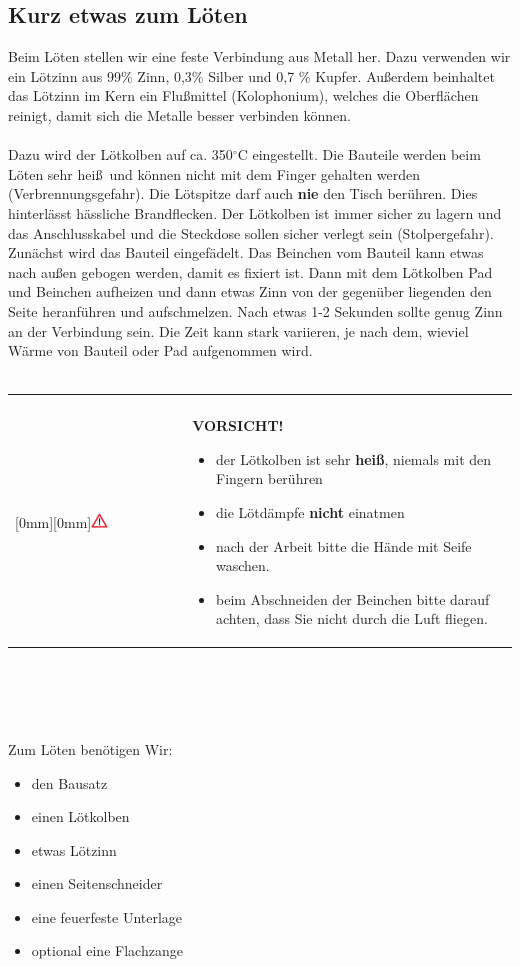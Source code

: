 \documentclass[a4paper]{article}
\newcommand\Vorsicht[1]{%
\ \\
\begin{tabular}{p{0.16\textwidth} p{0.79\textwidth}|}
\cline{2-2}
& \\
 \multirow{5}{*}{\raisebox{0mm}[0mm][0mm]{\includegraphics[width=0.1\textwidth]{../pictures/Vorsicht.png}}} & \textbf{VORSICHT!}{\begin{flushleft}#1\end{flushleft}} \\
\cline{2-2}
\end{tabular}
\ \\
}
\begin{document}
\subsection{Kurz etwas zum Löten}
Beim Löten stellen wir eine feste Verbindung aus Metall her. Dazu verwenden wir ein Lötzinn aus 99\% Zinn, 0,3\% Silber und 0,7 \% Kupfer. Außerdem beinhaltet das Lötzinn im Kern ein Flußmittel (Kolophonium), welches die Oberflächen reinigt, damit sich die Metalle besser verbinden können.\\
\ \\
Dazu wird der Lötkolben auf ca. 350$^{\circ}$C eingestellt. Die Bauteile werden beim Löten sehr hei\ss \ und können nicht mit dem Finger gehalten werden (Verbrennungsgefahr). Die Lötspitze darf auch \textbf{nie} den Tisch berühren. Dies hinterlässt hässliche Brandflecken. Der Lötkolben ist immer sicher zu lagern und das Anschlusskabel und die Steckdose sollen sicher verlegt sein (Stolpergefahr).\\
Zunächst wird das Bauteil eingefädelt. Das Beinchen vom Bauteil kann etwas nach au\ss en gebogen werden, damit es fixiert ist. Dann mit dem Lötkolben Pad und Beinchen aufheizen und dann etwas Zinn von der gegenüber liegenden den Seite heranführen und aufschmelzen. Nach etwas 1-2 Sekunden sollte genug Zinn an der Verbindung sein. Die Zeit kann stark variieren, je nach dem, wieviel Wärme von Bauteil oder Pad aufgenommen wird.\\
\Vorsicht{\begin{itemize} \item der Lötkolben ist sehr \textbf{heiß}, niemals mit den Fingern berühren
\item die Lötdämpfe \textbf{nicht} einatmen \item nach der Arbeit bitte die Hände mit Seife waschen.\item beim Abschneiden der Beinchen bitte darauf achten, dass Sie nicht durch die Luft fliegen.\end{itemize}}\\
\ \\
\ \\
Zum Löten benötigen Wir:
\begin{itemize}
  \item     den Bausatz
  \item     einen Lötkolben
  \item     etwas Lötzinn
  \item     einen Seitenschneider
  \item     eine feuerfeste Unterlage
  \item     optional eine Flachzange
\end{itemize}
\end{document}
